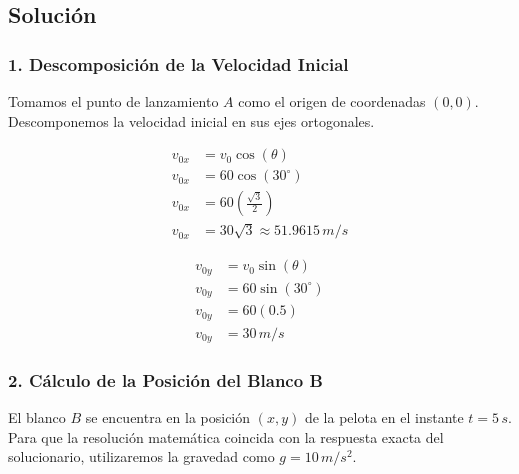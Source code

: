 \documentclass[12pt, a4paper]{article}
\begin{document}
\begin{center}
\end{center}

\subsection*{Solución}

\subsubsection*{1. Descomposición de la Velocidad Inicial}
Tomamos el punto de lanzamiento $A$ como el origen de coordenadas $(0,0)$. Descomponemos la velocidad inicial en sus ejes ortogonales.

\begin{align*}
v_{0x} &= v_0 \cos(\theta) \\
v_{0x} &= 60 \cos(30^\circ) \\
v_{0x} &= 60 \left(\frac{\sqrt{3}}{2}\right) \\
v_{0x} &= 30\sqrt{3} \approx 51.9615 \, \si{m/s}
\end{align*}

\begin{align*}
v_{0y} &= v_0 \sin(\theta) \\
v_{0y} &= 60 \sin(30^\circ) \\
v_{0y} &= 60 (0.5) \\
v_{0y} &= 30 \, \si{m/s}
\end{align*}

\subsubsection*{2. Cálculo de la Posición del Blanco B}
El blanco $B$ se encuentra en la posición $(x, y)$ de la pelota en el instante $t = 5 \, \si{s}$. Para que la resolución matemática coincida con la respuesta exacta del solucionario, utilizaremos la gravedad como $g = 10 \, \si{m/s^2}$.
\end{document}

